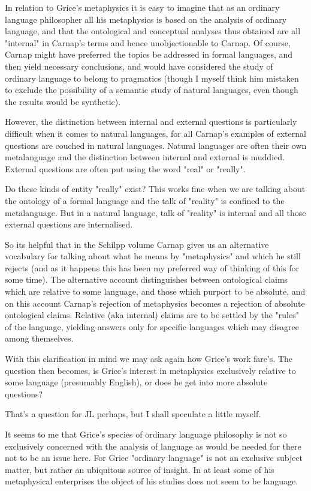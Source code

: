 \documentclass[10pt,titlepage]{book}
\begin{document}
In relation to Grice's metaphysics it is easy to imagine that as an ordinary language philosopher all his metaphysics is based on the analysis of ordinary language, and that the ontological and conceptual analyses thus obtained are all "internal" in Carnap's terms and hence unobjectionable to Carnap.  Of course, Carnap might have preferred the topics be addressed in formal languages, and then yield necessary conclusions, and would have considered the study of ordinary language to belong to pragmatics (though I myself think him mistaken to exclude the possibility of a semantic study of natural languages, even though the results would be synthetic).

However, the distinction between internal and external questions is particularly difficult when it comes to natural languages, for all Carnap's examples of external questions are couched in natural languages.  Natural languages are often their own metalanguage and the distinction between internal and external is muddied.  External questions are often put using the word "real" or "really".

Do these kinds of entity "really" exist?  This works fine when we are talking about the ontology of a formal language and the talk of "reality" is confined to the metalanguage.  But in a natural language, talk of "reality" is internal and all those external questions are internalised.

So its helpful that in the Schilpp volume \cite{carnap63a} Carnap gives us an alternative vocabulary for talking about what he means by "metaphysics" and which he still rejects (and as it happens this has been my preferred way of thinking of this for some time).  The alternative account distinguishes between ontological claims which are relative to some language, and those which purport to be absolute, and on this account Carnap's rejection of metaphysics becomes a rejection of absolute ontological claims.  Relative (aka internal) claims are to be settled by the "rules" of the language, yielding answers only for specific languages which may disagree among themselves.

With this clarification in mind we may ask again how Grice's work fare's.  The question then becomes, is Grice's interest in metaphysics exclusively relative to some language (presumably English), or does he get into more absolute questions?

That's a question for JL perhaps, but I shall speculate a little myself.

It seems to me that Grice's species of ordinary language philosophy is not so exclusively concerned with the analysis of language as would be needed for there not to be an issue here.  For Grice "ordinary language" is not an exclusive subject matter, but rather an ubiquitous source of insight.  In at least some of his metaphysical enterprises the object of his studies does not seem to be language.
\end{document}
